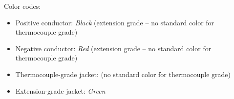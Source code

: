 \vskip 10pt

Color codes:

\begin{itemize}
\item{} Positive conductor: {\it Black} (extension grade -- no standard color for thermocouple grade)
\item{} Negative conductor: {\it Red} (extension grade -- no standard color for thermocouple grade)
\item{} Thermocouple-grade jacket: (no standard color for thermocouple grade)
\item{} Extension-grade jacket: {\it Green}
\end{itemize}











